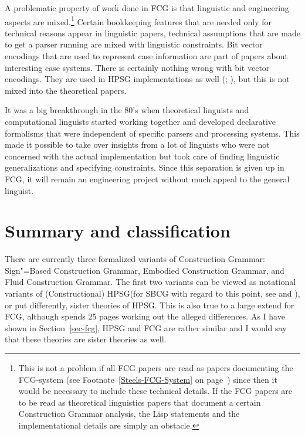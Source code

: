 
A problematic property of work done in FCG is that linguistic and engineering aspects are mixed.\footnote{%
This is not a problem if all FCG papers are read as papers documenting the FCG-system (see
Footnote~\ref{Steels-FCG-System} on page~\pageref{Steels-FCG-System}) since then it
would be necessary to include these technical details. If the FCG papers are to be read as
theoretical linguistics papers that document a certain Construction Grammar analysis, the Lisp statements
and the implementational details are simply an obstacle.
} Certain bookkeeping features that are needed only
for technical reasons appear in linguistic papers, technical assumptions that are made to get a
parser running are mixed with linguistic constraints. Bit vector encodings that are used to
represent case information are part of papers about interesting case systems. There is certainly
nothing wrong with bit vector encodings. They are used in HPSG implementations as well
(\citealp[]{Reape91}; \citealp[]{Babel}), but this is
not mixed into the theoretical papers. 

It was a big breakthrough in the 80's when theoretical linguists and computational linguists started
working together and developed declarative formalisms that were independent of specific parsers and
processing systems. This made it possible to take over insights from a lot of linguists who were not
concerned with the actual implementation but took care of finding linguistic generalizations and
specifying constraints. Since this separation is given up in FCG, it will remain an engineering
project without much appeal to the general linguist.%
\indexhpsgend\indexsbcgend



\section{Summary and classification}

\begin{sloppypar}
There are currently three formalized variants of Construction Grammar: Sign"=Based Construction
Grammar, Embodied Construction Grammar, and Fluid Construction Grammar. The first two variants can
be viewed as notational variants of (Constructional) HPSG\indexhpsg (for SBCG with regard to this
point, see  and ), or put differently, sister
theories of HPSG. This is also true to a large extend for FCG, although \citet{vanTrijp2013a} spends
25 pages working out the alleged differences. As I have shown in Section~\ref{sec-fcg}, HPSG and FCG are
rather similar and I would say that these theories are sister theories as well. 
\end{sloppypar}

